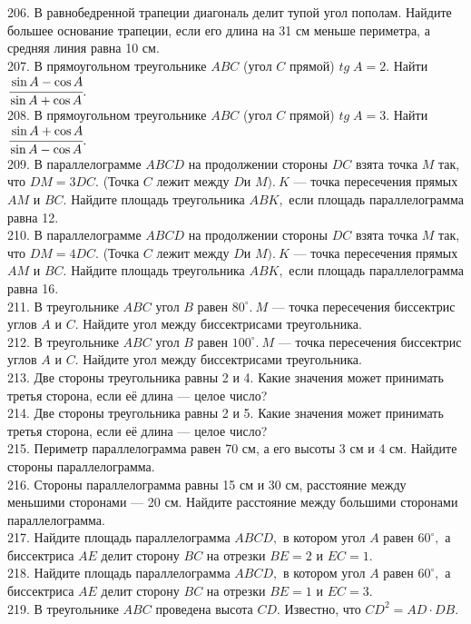 206. В равнобедренной трапеции диагональ делит тупой угол пополам. Найдите большее основание трапеции, если его длина на 31 см меньше периметра, а средняя линия равна 10 см.\\
207. В прямоугольном треугольнике $ABC$ (угол $C$ прямой) $tg\; A=2.$ Найти $\cfrac{\sin A -\cos A}{\sin A +\cos A}.$\\
208. В прямоугольном треугольнике $ABC$ (угол $C$ прямой) $tg\; A=3.$ Найти $\cfrac{\sin A +\cos A}{\sin A - \cos A}.$\\
209. В параллелограмме $ABCD$ на продолжении стороны $DC$ взята точка $M$ так, что $DM=3DC.$ (Точка $C$
лежит между $D$и $M).\ K$ --- точка пересечения прямых $AM$ и $BC.$ Найдите площадь треугольника $ABK,$ если
площадь параллелограмма равна 12.\\
210. В параллелограмме $ABCD$ на продолжении стороны $DC$ взята точка $M$ так, что $DM=4DC.$ (Точка $C$
лежит между $D$и $M).\ K$ --- точка пересечения прямых $AM$ и $BC.$ Найдите площадь треугольника $ABK,$ если
площадь параллелограмма равна 16.\\
211. В треугольнике $ABC$ угол $B$ равен $80^\circ.\ M$ --- точка пересечения биссектрис углов $A$ и $C.$
Найдите угол между биссектрисами треугольника.\\
212. В треугольнике $ABC$ угол $B$ равен $100^\circ.\ M$ --- точка пересечения биссектрис углов $A$ и $C.$
Найдите угол между биссектрисами треугольника.\\
213. Две стороны треугольника равны 2 и 4. Какие значения может принимать третья сторона, если её длина --- целое число?\\
214. Две стороны треугольника равны 2 и 5. Какие значения может принимать третья сторона, если её длина --- целое число?\\
215. Периметр параллелограмма равен 70 см, а его высоты 3 см и 4 см. Найдите стороны параллелограмма.\\
216. Стороны параллелограмма равны 15 см и 30 см, расстояние между меньшими сторонами --- 20 см. Найдите расстояние между большими сторонами параллелограмма.\\
217. Найдите площадь параллелограмма $ABCD,$ в котором угол $A$ равен $60^\circ,$ а биссектриса $AE$ делит сторону $BC$ на отрезки $BE=2$ и $EC=1.$\\
218. Найдите площадь параллелограмма $ABCD,$ в котором угол $A$ равен $60^\circ,$ а биссектриса $AE$ делит сторону $BC$ на отрезки $BE=1$ и $EC=3.$\\
219. В треугольнике $ABC$ проведена высота $CD.$ Известно, что $CD^2=AD\cdot DB.$\\
